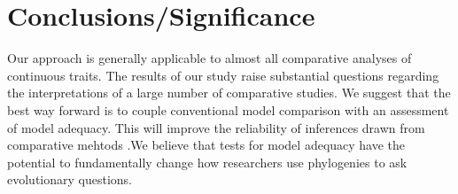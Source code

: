 \documentclass[a4paper,12pt]{article}
\begin{document}
\section*{Conclusions/Significance}

Our approach is generally applicable to almost all comparative analyses of continuous traits. The results of our study raise substantial questions regarding the interpretations of a large number of comparative studies. We suggest that the best way forward is to couple conventional model comparison with an assessment of model adequacy. This will improve the reliability of inferences drawn from comparative mehtods .We believe that tests for model adequacy have the potential to fundamentally change how researchers use phylogenies to ask evolutionary questions. 



\end{document}
